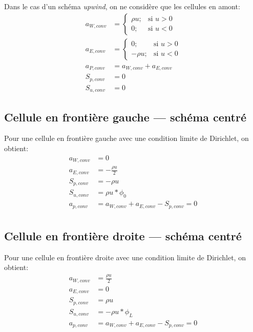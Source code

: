 \documentclass[12pt]{article}
\begin{document}
Dans le cas d'un schéma \emph{upwind}, on ne considère que les cellules en amont:
\begin{align}
	a_{W,conv} &= 
	\begin{cases}
		\rho u; & \text{si } u > 0 \\
		0; & \text{si } u < 0 
	\end{cases}\\
	a_{E,conv} &=
	\begin{cases}
		0; & \text{si } u > 0 \\
		-\rho u; & \text{si } u < 0 
	\end{cases}\\
	a_{P,conv} &= a_{W,conv} + a_{E,conv} \\
	S_{p,conv} &= 0 \\
	S_{u,conv} &= 0
\end{align}

\subsection{Cellule en frontière gauche --- schéma centré}

Pour une cellule en frontière gauche avec une condition limite de Dirichlet, on
obtient:
\begin{align}
	a_{W,conv} &= 0 \\
	a_{E,conv} &= -\frac{\rho u}{2}\\
	S_{p,conv} &= -\rho u \\
	S_{u,conv} &= \rho u * \phi_0 \\
	a_{p,conv} &= a_{W,conv} + a_{E,conv} - S_{p,conv} = 0 \\
\end{align}

\subsection{Cellule en frontière droite --- schéma centré}

Pour une cellule en frontière droite avec une condition limite de Dirichlet, on
obtient:
\begin{align}
	a_{W,conv} &= \frac{\rho u}{2} \\
	a_{E,conv} &= 0 \\
	S_{p,conv} &= \rho u \\
	S_{u,conv} &= -\rho u * \phi_L \\
	a_{p,conv} &= a_{W,conv} + a_{E,conv} - S_{p,conv} = 0 \\
\end{align}
\end{document}

